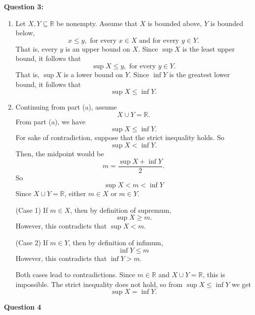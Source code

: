 \documentclass[12pt]{article}
\begin{document}
\noindent{} \textbf{Question 3:}
\begin{enumerate}
      \item [(a)] Let $X, Y \subseteq \mathbb{R}$ be nonempty. Assume that $X$ is bounded above, $Y$ is bounded below,
            \[
                  x \leq y, \text{ for every } x \in X \text{ and for every } y \in Y.
            \]
            That is, every $y$ is an upper bound on $X$.
            Since $\sup X$ is the least upper bound, it follows that
            \[
                  \sup X \leq y, \text{ for every } y \in Y.
            \]
            That is, $\sup X$ is a lower bound on $Y$.
            Since $\inf Y$ is the greatest lower bound, it follows that
            \[
                  \sup X \leq \inf Y.
            \]
      \item [(b)]
            Continuing from part (a), assume
            \[
                  X \cup Y = \mathbb{R}.
            \]
            From part (a), we have
            \[
                  \sup X \leq \inf Y.
            \]
            For sake of contradiction, suppose that the strict inequality holds. So
            \[
                  \sup X < \inf Y.
            \]
            Then, the midpoint would be
            \[
                  m = \frac{\sup X + \inf Y}{2}.
            \]
            So
            \[
                  \sup X < m < \inf Y
            \]
            Since $X \cup Y = \mathbb{R}$, either $m \in X$ or $m \in Y$.

            (Case 1) If $m \in X$, then by definition of supremum,
            \[
                  \sup X \geq m.
            \]
            However, this contradicts that $\sup X < m$.

            (Case 2) If $m \in Y$, then by definition of infimum,
            \[
                  \inf Y \leq m
            \]
            However, this contradicts that $\inf Y > m$.

            Both cases lead to contradictions.
            Since $m \in \mathbb{R}$ and $X \cup Y = \mathbb{R}$, this is impossible.
            The strict inequality does not hold, so from $\sup X \leq \inf Y$ we get
            \[
                  \sup X = \inf Y.
            \]
\end{enumerate}

\noindent{} \textbf{Question 4}
\end{document}
